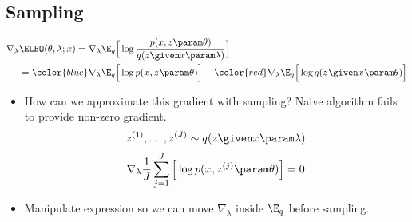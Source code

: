 




\subsection{Sampling}


\begin{frame}
\begin{align*}
    \nabla_\lambda &\ELBO(\theta, \lambda ; x) =  \nabla_\lambda \E_q \Big[\log \frac{ p(x, z \param \theta)}{ q (z \given x \param \lambda)} \Big]\\
    &= {\color{blue} \nabla_\lambda {\E_{ q}\Big[ \log p(x^{}, z^{} \param \theta) \Big]}} - {\color{red} \nabla_\lambda \E_{ q}\Big[ \log q( z^{} \given x^{} \param \theta) \Big]}  
\end{align*} 
\pause
\begin{itemize}
    \item How can we approximate this gradient with sampling?  Naive algorithm fails to provide non-zero gradient.
    \[ z^{(1)}, \dots, z^{(J)} \sim q(z \given x^{} \param \lambda) \]
 \[ \nabla_\lambda \frac{1}{J} \sum_{j=1}^J \Big[ \log p(x^{}, z^{(j)} \param \theta) \Big] = 0\]
    \item Manipulate expression so we can move $\nabla_\lambda$ inside $\E_q$ before sampling.
\end{itemize}
\end{frame}



